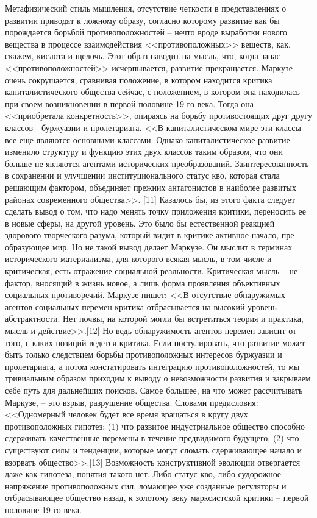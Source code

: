 \documentclass{book}
\begin{document}
Метафизический стиль мышления, отсутствие четкости в представлениях о развитии приводят к ложному образу, со­гласно которому развитие как бы порождается борьбой про­тивоположностей -- нечто вроде выработки нового вещества в процессе взаимодействия <<противоположных>> веществ, как, скажем, кислота и щелочь. Этот образ наводит на мысль, что, когда запас <<противоположностей>> исчерпывается, развитие прекращается. Маркузе очень сокрушается, сравнивая поло­жение, в котором находится критика капиталистического об­щества сейчас, с положением, в котором она находилась при своем возникновении в первой половине 19-го века. Тогда она <<приобретала конкретность>>, опираясь на борьбу противо­стоящих друг другу классов - буржуазии и пролетариата. <<В капиталистическом мире эти классы все еще являются основ­ными классами. Однако капиталистическое развитие измени­ло структуру и функцию этих двух классов таким образом, что они больше не являются агентами исторических преобра­зований. Заинтересованность в сохранении и улучшении 
инсти­туционального статус кво, которая стала решающим фактором, объединяет прежних антагонистов в наиболее развитых рай­онах современного общества>>. [11] Казалось бы, из этого фак­та следует сделать вывод о том, что надо менять точку прило­жения критики, переносить ее в новые сферы, на другой уро­вень. Это было бы естественной реакцией здорового творче­ского разума, который видит в критике активное начало, пре­образующее мир. Но не такой вывод делает Маркузе. Он мыслит в терминах исторического материализма, для которого всякая мысль, в том числе и критическая, есть отражение социальной реальности. Критическая мысль -- не фактор, вносящий в жизнь новое, а лишь форма проявления объективных социальных противоречий. Маркузе пишет: <<В отсутствие обнаружимых агентов социальных перемен критика отбрасывается на высо­кий уровень абстрактности. Нет почвы, на которой могли бы встретиться теория и практика, мысль и действие>>.[12] Но ведь обнаружимость агентов перемен зависит от того, с каких пози­ций ведется критика. 
Если постулировать, что развитие может быть только следствием борьбы противоположных интересов буржуазии и пролетариата, а потом констатировать интегра­цию противоположностей, то мы тривиальным образом при­ходим к выводу о невозможности развития и закрываем себе путь для дальнейших поисков. Самое большее, на что может рассчитывать Маркузе, -- это взрыв, разрушение общества. Словами предисловия: <<Одномерный человек  будет все время вращаться в кругу двух противоположных гипотез: (1) что развитое индустриальное общество способно сдерживать ка­чественные перемены в течение предвидимого будущего; (2) что существуют силы и тенденции, которые могут сломать сдерживающее начало и взорвать общество>>.[13] Возможность конструктивной эволюции отвергается даже как гипотеза, по­нятия такого нет. Либо статус кво, либо судорожное напряже­ние противоположных сил, ломающее уже созданные регуля­торы и отбрасывающее общество назад, к золотому веку марк­систской критики -- первой половине 19-го века.
\end{document}
